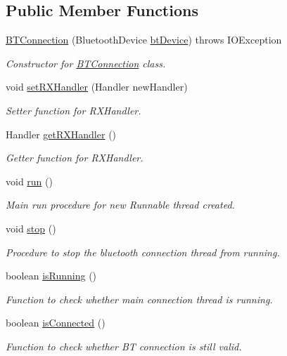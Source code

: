 \subsection*{Public Member Functions}
\begin{DoxyCompactItemize}
\item 
\hyperlink{class_android_app_1_1_b_t_connection_a9211856a493caa2423f07e36c2fd12b6}{B\+T\+Connection} (Bluetooth\+Device \hyperlink{class_android_app_1_1_b_t_connection_a3ed1e51b0f24f0b20ca5c27270f2999c}{bt\+Device})  throws I\+O\+Exception 
\begin{DoxyCompactList}\small\item\em Constructor for \hyperlink{class_android_app_1_1_b_t_connection}{B\+T\+Connection} class. \end{DoxyCompactList}\item 
void \hyperlink{class_android_app_1_1_b_t_connection_a41022747db3c5a8bf0f4ddbc7bf32a3d}{set\+R\+X\+Handler} (Handler new\+Handler)
\begin{DoxyCompactList}\small\item\em Setter function for R\+X\+Handler. \end{DoxyCompactList}\item 
Handler \hyperlink{class_android_app_1_1_b_t_connection_a2d2a381cb7cb2bcab1db0c804e85a32d}{get\+R\+X\+Handler} ()
\begin{DoxyCompactList}\small\item\em Getter function for R\+X\+Handler. \end{DoxyCompactList}\item 
void \hyperlink{class_android_app_1_1_b_t_connection_a03907fd685748cb0da88a7f17d90885f}{run} ()
\begin{DoxyCompactList}\small\item\em Main run procedure for new Runnable thread created. \end{DoxyCompactList}\item 
\mbox{\label{class_android_app_1_1_b_t_connection_a4f542434c59f541d47b68a0e225cfea9}} 
void \hyperlink{class_android_app_1_1_b_t_connection_a4f542434c59f541d47b68a0e225cfea9}{stop} ()
\begin{DoxyCompactList}\small\item\em Procedure to stop the bluetooth connection thread from running. \end{DoxyCompactList}\item 
boolean \hyperlink{class_android_app_1_1_b_t_connection_a88abb39350aef278f15e54be4d0d1df3}{is\+Running} ()
\begin{DoxyCompactList}\small\item\em Function to check whether main connection thread is running. \end{DoxyCompactList}\item 
boolean \hyperlink{class_android_app_1_1_b_t_connection_a1c91fcddfe9f3b69cd0141742103191a}{is\+Connected} ()
\begin{DoxyCompactList}\small\item\em Function to check whether BT connection is still valid. \end{DoxyCompactList}\end{DoxyCompactItemize}
